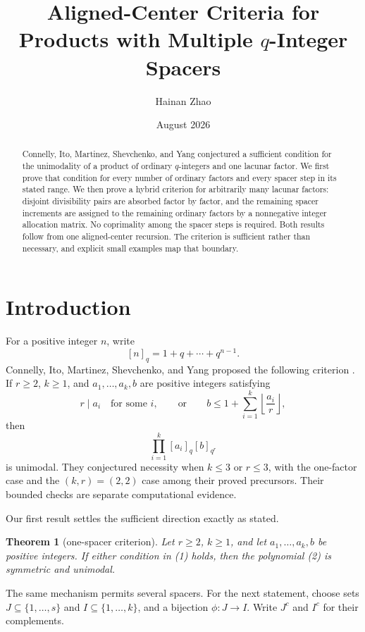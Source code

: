 \documentclass[11pt]{article}
\title{Aligned-Center Criteria for Products with Multiple
\(q\)-Integer Spacers}
\author{Hainan Zhao}
\date{August 2026}
\newtheorem{theorem}{Theorem}
\begin{document}
\maketitle

\begin{abstract}
Connelly, Ito, Martinez, Shevchenko, and Yang conjectured a sufficient
condition for the unimodality of a product of ordinary \(q\)-integers and
one lacunar factor.  We first prove that condition for every number of
ordinary factors and every spacer step in its stated range.  We then prove
a hybrid criterion for arbitrarily many lacunar factors: disjoint
divisibility pairs are absorbed factor by factor, and the remaining spacer
increments are assigned to the remaining ordinary factors by a nonnegative
integer allocation matrix.  No coprimality among the spacer steps is
required.  Both results follow from one aligned-center recursion.  The
criterion is sufficient rather than necessary, and explicit small examples
map that boundary.
\end{abstract}

\section{Introduction}

For a positive integer \(n\), write
\[
 [n]_q=1+q+\cdots+q^{n-1}.
\]
Connelly, Ito, Martinez, Shevchenko, and Yang proposed the following
criterion \cite[Conjecture~5.4]{CIMSY}.  If \(r\geq2\), \(k\geq1\), and
\(a_1,\ldots,a_k,b\) are positive integers satisfying
\[
 r\mid a_i\quad\text{for some }i,
 \qquad\text{or}\qquad
 b\leq1+\sum_{i=1}^k\left\lfloor\frac{a_i}{r}\right\rfloor,
 \tag{1}
\]
then
\[
 \prod_{i=1}^k[a_i]_q[b]_{q^r}                    \tag{2}
\]
is unimodal.  They conjectured necessity when \(k\leq3\) or \(r\leq3\),
with the one-factor case and the \((k,r)=(2,2)\) case among their proved
precursors.  Their bounded checks are separate computational evidence.

Our first result settles the sufficient direction exactly as stated.

\begin{theorem}[one-spacer criterion]\label{thm:one-spacer}
Let \(r\geq2\), \(k\geq1\), and let \(a_1,\ldots,a_k,b\) be positive
integers.  If either condition in \emph{(1)} holds, then the polynomial
\emph{(2)} is symmetric and unimodal.
\end{theorem}

The same mechanism permits several spacers.  For the next statement, choose
sets \(J\subseteq\{1,\ldots,s\}\) and
\(I\subseteq\{1,\ldots,k\}\), and a bijection
\(\phi:J\to I\).  Write \(J^c\) and \(I^c\) for their complements.
\end{document}
